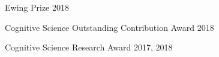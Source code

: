 

\begin{cvhonors}

  \cvhonor
    {Ewing Prize} %
    {} %
    {2018} %

  \cvhonor
    {Cognitive Science Outstanding Contribution Award} %
    {} %
    {2018} %

  \cvhonor
    {Cognitive Science Research Award} %
    {} %
    {2017, 2018} %

\end{cvhonors}

\iffalse

\cvsubsection{Not Funded}

\begin{cvhonors}

  \cvhonor
    {3rd Place} %
    {WITHCON Hacking Competition Final} %
    {Seoul, S.Korea} %
    {2015} %

  \cvhonor
    {Silver Prize} %
    {KISA HDCON Hacking Competition Final} %
    {Seoul, S.Korea} %
    {2017} %

\end{cvhonors}
\fi

